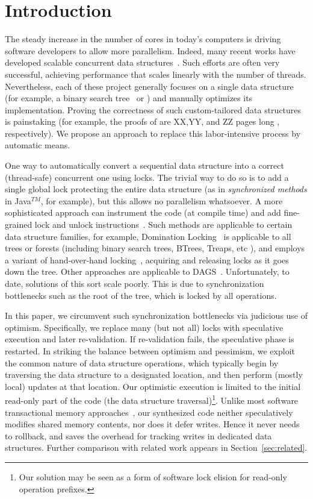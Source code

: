 \section{Introduction} \label{sec:intro}

The steady increase in the number of  cores in today's computers is driving software developers to allow more parallelism. 
Indeed, many recent works have developed scalable concurrent data structures~\cite{bronson,dana,citrus,etc}. 
Such efforts are often very successful, achieving performance that scales linearly with the number of threads. 
Nevertheless, each of these project generally focuses on a single data structure 
(for example, a binary search tree~\cite{citrus} or ) and manually optimizes its implementation. 
Proving the correctness of such custom-tailored data structures is painstaking 
(for example, the proofs of \cite{x,y,z} are XX,YY, and ZZ pages long , respectively). 
We propose an approach to replace this labor-intensive process by automatic means.

One way to automatically convert a sequential data structure into a correct (thread-safe) concurrent one using locks. 
The trivial way to do so is to add a single global lock protecting the entire data structure 
(as in \emph{synchronized methods} in Java$^{TM}$, for example), but this allows no parallelism whatsoever. 
A more sophisticated approach can instrument the code (at compile time) and add fine-grained lock and unlock instructions~\cite{domination,tree-locking,dag,etc}. Such methods are applicable to certain data structure families, for example, Domination Locking~\cite{domination} is applicable to all trees or forests  (including binary search trees, BTrees, Treaps, etc ), and employs a variant of hand-over-hand locking~\cite{hand-over-hand}, acquiring and releasing locks as it goes down the tree.  Other approaches are applicable to DAGS~\cite{dag-locking}. Unfortunately, to date, solutions of this sort scale poorly. This is due to synchronization bottlenecks such as the root of the tree, which is locked by all operations.

In this paper, we circumvent such synchronization bottlenecks via judicious use of optimism. 
Specifically, we replace many (but not all) locks with speculative execution and later re-validation. 
If re-validation fails, the speculative phase is restarted. 
In striking the balance between optimism and pessimism, we exploit the common nature of data structure operations, 
which typically begin by traversing the data structure to a designated location, and then perform (mostly local) updates at that location. 
Our optimistic execution is limited to the initial read-only part of the code (the data structure traversal)\footnote{Our solution may be seen as a form of software lock elision for read-only operation prefixes.}. 
Unlike most software transactional memory approaches~\cite{stm,tls},  
our synthesized code neither speculatively modifies shared memory contents, nor does it defer writes. 
Hence it never needs to rollback, and saves the overhead for tracking writes in dedicated data structures. 
Further comparison with related work appears in Section~\ref{sec:related}.

